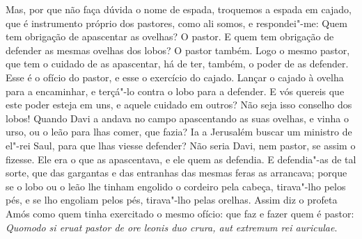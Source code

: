 Mas, por que não faça dúvida o nome de espada, troquemos a espada em
cajado, que é instrumento próprio dos pastores, como ali somos, e
respondei"-me: Quem tem obrigação de apascentar as ovelhas? O pastor. E
quem tem obrigação de defender as mesmas ovelhas dos lobos? O pastor
também. Logo o mesmo pastor, que tem o cuidado de as apascentar, há de
ter, também, o poder de as defender. Esse é o ofício do pastor, e esse o
exercício do cajado. Lançar o cajado à ovelha para a encaminhar, e
terçá"-lo contra o lobo para a defender. E vós quereis que este poder
esteja em uns, e aquele cuidado em outros? Não seja isso conselho dos
lobos! Quando Davi a andava no campo apascentando as suas ovelhas, e
vinha o urso, ou o leão para lhas comer, que fazia? Ia a Jerusalém
buscar um ministro de el"-rei Saul, para que lhas viesse defender? Não
seria Davi, nem pastor, se assim o fizesse. Ele era o que as
apascentava, e ele quem as defendia. E defendia"-as de tal sorte, que das
gargantas e das entranhas das mesmas feras as arrancava; porque se o
lobo ou o leão lhe tinham engolido o cordeiro pela cabeça, tirava"-lho
pelos pés, e se lho engoliam pelos pés, tirava"-lho pelas orelhas.
Assim diz o profeta Amós como quem tinha exercitado o mesmo ofício:
que faz e fazer quem é pastor: \emph{Quomodo si eruat pastor de ore
leonis duo crura, aut extremum rei auriculae}.

